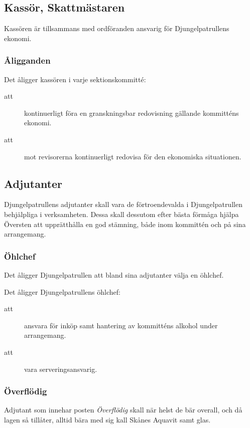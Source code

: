 \documentclass[a4paper]{article}
\begin{document}
\begin{foreningenv}{\forening{}}
    \subsection{Kassör, Skattmästaren}
    Kassören är tillsammans med ordföranden ansvarig för Djungelpatrullens ekonomi.
    
    \subsubsection{Åligganden}
    Det åligger kassören i varje sektionskommitté:
    \begin{description}
        \item[att] kontinuerligt föra en granskningsbar redovisning gällande kommitténs ekonomi.
        \item[att] mot revisorerna kontinuerligt redovisa för den ekonomiska situationen.
    \end{description}
    
    \subsection{Adjutanter}
    Djungelpatrullens adjutanter skall vara de förtroendevalda i Djungelpatrullen behjälpliga i verksamheten. Dessa skall dessutom efter bästa förmåga hjälpa Översten att upprätthålla en god stämning, både inom kommittén och på sina arrangemang.
        
    \subsubsection{Öhlchef}
    Det åligger Djungelpatrullen att bland sina adjutanter välja en öhlchef.
    
    Det åligger Djungelpatrullens öhlchef:
    \begin{description}
        \item[att] ansvara för inköp samt hantering av kommitténs alkohol under arrangemang.
        \item[att] vara serveringsansvarig.
    \end{description}
    
    \subsubsection{Överflödig}
    Adjutant som innehar posten \textit{Överflödig} skall när helst de bär overall, och då lagen så tillåter, alltid bära med sig kall Skånes Aquavit samt glas.
\end{foreningenv}
\end{document}

